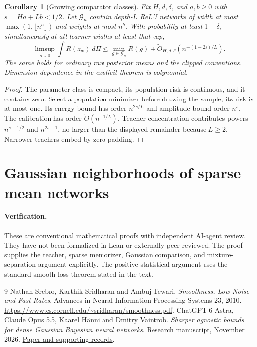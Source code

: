 \documentclass[11pt]{article}
\newtheorem{corollary}[theorem]{Corollary}\newtheorem{proposition}[theorem]{Proposition}
\theoremstyle{remark}\newtheorem{remark}[theorem]{Remark}
\newcommand{\Risk}{R}\newcommand{\empRisk}{\widehat R}
\begin{document}
\begin{corollary}[Growing comparator classes]
\label{cor:growing}
Fix $H,d,\delta$, and $a,b\ge0$ with $s=Ha+Lb<1/2$. Let $\mathcal G_n$ contain depth-$L$ ReLU networks of width at most $\max(1,\lfloor n^a\rfloor)$ and weights at most $n^b$. With probability at least $1-\delta$, simultaneously at all learner widths at least that cap,
\[
 \limsup_{\sigma\downarrow0}\int\Risk(z_w)\,d\Pi
 \le\min_{g\in\mathcal G_n}\Risk(g)
       +\widetilde O_{H,d,\delta}\left(n^{-(1-2s)/L}\right).
\]
The same holds for ordinary raw posterior means and the clipped conventions. Dimension dependence in the explicit theorem is polynomial.
\end{corollary}
\begin{proof}
The parameter class is compact, its population risk is continuous, and it contains zero. Select a population minimizer before drawing the sample; its risk is at most one. Its energy bound has order $n^{2s/L}$ and amplitude bound order $n^s$. The calibration has order $\widetilde O(n^{-1/L})$. Teacher concentration contributes powers $n^{s-1/2}$ and $n^{2s-1}$, no larger than the displayed remainder because $L\ge2$. Narrower teachers embed by zero padding.
\end{proof}




\section{Gaussian neighborhoods of sparse mean networks}







\paragraph{Verification.}
These are conventional mathematical proofs with independent AI-agent review. They have not been formalized in Lean or externally peer reviewed. The proof supplies the teacher, sparse memorizer, Gaussian comparison, and mixture-separation argument explicitly. The positive statistical argument uses the standard smooth-loss theorem stated in the text.

\begin{thebibliography}{9}
Nathan Srebro, Karthik Sridharan and Ambuj Tewari.
\emph{Smoothness, Low Noise and Fast Rates}.
Advances in Neural Information Processing Systems 23, 2010.
\url{https://www.cs.cornell.edu/~sridharan/smoothness.pdf}.
ChatGPT-6 Astra, Claude Opus 5.5, Kaarel H\"anni and Dmitry Vaintrob.
\emph{Sharper agnostic bounds for dense Gaussian Bayesian neural networks}.
Research manuscript, November 2026.
\href{https://github.com/kaarelh/AI-works/tree/main/neural-network-generalization/works-in-progress/agnostic-oracle-improvements}{Paper and supporting records}.
\end{thebibliography}
\end{document}
